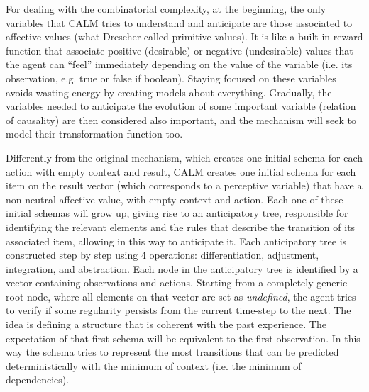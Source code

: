 \documentclass[runningheads]{llncs}
\begin{document}
For dealing with the combinatorial complexity, at the beginning, the only variables that CALM tries to understand and anticipate are those associated to affective values (what Drescher called primitive values).
It is like a built-in reward function that associate positive (desirable) or negative (undesirable) values that the agent can ``feel'' immediately depending on the value of the variable (i.e. its observation, e.g. true or false if boolean).
Staying focused on these variables avoids wasting energy by creating models about everything. 
Gradually, the variables needed to anticipate the evolution of some important variable (relation of causality) are then considered also important, and the mechanism will seek to model their transformation function too.

Differently from the original mechanism, which creates one initial schema for each action with empty context and result, CALM creates one initial schema for each item on the result vector (which corresponds to a perceptive variable) that have a non neutral affective value, with empty context and action.
Each one of these initial schemas will grow up, giving rise to an anticipatory tree, responsible for identifying the relevant elements and the rules that describe the transition of its associated item, allowing in this way to anticipate it. 
Each anticipatory tree is constructed step by step using 4 operations: differentiation, adjustment, integration, and abstraction.
Each node in the anticipatory tree is identified by a vector containing observations and actions. 
Starting from a completely generic root node, where all elements on that vector are set as \textit{undefined}, the agent tries to verify if some regularity persists from the current time-step to the next.
The idea is defining a structure that is coherent with the past experience.
The expectation of that first schema will be equivalent to the first observation. 
In this way the schema tries to represent the most transitions that can be predicted deterministically with the minimum of context (i.e. the minimum of dependencies).
\end{document}
